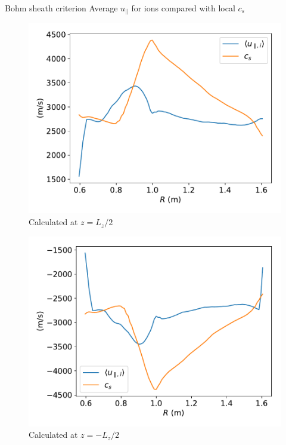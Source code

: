 \documentclass[12pt,table]{beamer}
\begin{document}
\begin{frame}{Bohm sheath criterion}
  Average $u_\parallel$ for ions compared with local $c_s$
  \begin{minipage}{.49\linewidth}
  \begin{figure}
      \centering
      \includegraphics[width=\linewidth]{figs/cs-upar-T.pdf} \\
      \tiny Calculated at $z = L_z/2$
      \label{fig:my_label}
  \end{figure}
  \end{minipage}
    \begin{minipage}{.49\linewidth}
  \begin{figure}
      \centering
      \includegraphics[width=\linewidth]{figs/cs-upar-B.pdf} \\
      \tiny Calculated at $z = -L_z/2$
      \label{fig:my_label}
  \end{figure}
  \end{minipage}
\end{frame}
\end{document}
